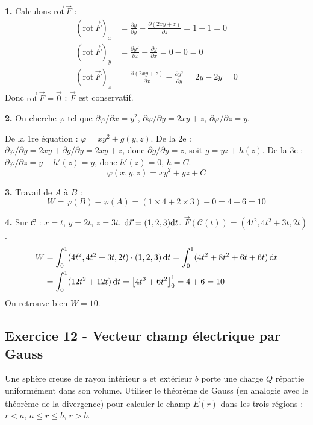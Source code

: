 \documentclass[12pt,a4paper]{article}
\begin{document}
\begin{boitecorrige}
\textbf{1.} Calculons $\overrightarrow{\text{rot}}\,\vec{F}$ :
\begin{align*}
(\text{rot}\,\vec{F})_x &= \frac{\partial y}{\partial y} - \frac{\partial(2xy+z)}{\partial z} = 1-1=0\\
(\text{rot}\,\vec{F})_y &= \frac{\partial y^2}{\partial z} - \frac{\partial y}{\partial x} = 0-0=0\\
(\text{rot}\,\vec{F})_z &= \frac{\partial(2xy+z)}{\partial x} - \frac{\partial y^2}{\partial y} = 2y-2y=0
\end{align*}
Donc $\overrightarrow{\text{rot}}\,\vec{F} = \vec{0}$ : $\vec{F}$ est conservatif.

\textbf{2.} On cherche $\varphi$ tel que $\partial\varphi/\partial x = y^2$, $\partial\varphi/\partial y = 2xy+z$, $\partial\varphi/\partial z = y$.

De la 1re équation : $\varphi = xy^2 + g(y,z)$.
De la 2e : $\partial\varphi/\partial y = 2xy + \partial g/\partial y = 2xy+z$, donc $\partial g/\partial y = z$, soit $g = yz + h(z)$.
De la 3e : $\partial\varphi/\partial z = y + h'(z) = y$, donc $h'(z)=0$, $h = C$.
\[
\boxed{\varphi(x,y,z) = xy^2 + yz + C}
\]

\textbf{3.} Travail de $A$ à $B$ :
\[
W = \varphi(B)-\varphi(A) = (1\times4+2\times3)-0 = 4+6 = 10
\]

\textbf{4.} Sur $\mathcal{C}$ : $x=t$, $y=2t$, $z=3t$, $\mathrm{d}\vec{r} = (1,2,3)\mathrm{d} t$.
$\vec{F}(\mathcal{C}(t)) = (4t^2, 4t^2+3t, 2t)$.
\begin{align*}
W &= \int_0^1 (4t^2, 4t^2+3t, 2t)\cdot(1,2,3)\,\mathrm{d} t = \int_0^1(4t^2+8t^2+6t+6t)\,\mathrm{d} t\\
&= \int_0^1(12t^2+12t)\,\mathrm{d} t = \left[4t^3+6t^2\right]_0^1 = 4+6 = 10
\end{align*}
On retrouve bien $W=10$.
\end{boitecorrige}

\subsection*{Exercice 12 - Vecteur champ électrique par Gauss \niveau{\moyen}}

\begin{boiteexercice}
Une sphère creuse de rayon intérieur $a$ et extérieur $b$ porte une charge $Q$ répartie uniformément dans son volume. Utiliser le théorème de Gauss (en analogie avec le théorème de la divergence) pour calculer le champ $\vec{E}(r)$ dans les trois régions : $r<a$, $a\leq r\leq b$, $r>b$.
\end{boiteexercice}
\end{document}
